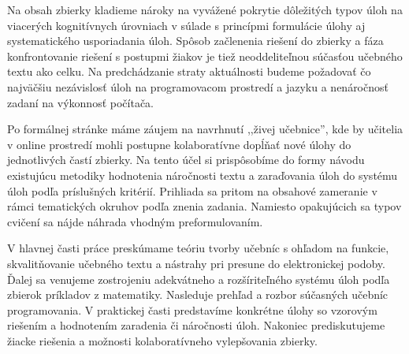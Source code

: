 Na obsah zbierky kladieme nároky na vyvážené pokrytie dôležitých typov úloh na viacerých kognitívnych úrovniach v súlade s princípmi formulácie úlohy aj systematického usporiadania úloh. Spôsob začlenenia riešení do zbierky a fáza konfrontovanie riešení s postupmi žiakov je tiež neoddeliteľnou súčasťou učebného textu ako celku. Na predchádzanie straty aktuálnosti budeme požadovať čo najväčšiu nezávislosť úloh na programovacom prostredí a jazyku a nenáročnosť zadaní na výkonnosť počítača. 

Po formálnej stránke máme záujem na navrhnutí ,,živej učebnice'', kde by učitelia v online prostredí mohli postupne kolaboratívne dopĺňať nové úlohy do jednotlivých častí zbierky. Na tento účel si prispôsobíme do formy návodu existujúcu metodiky hodnotenia náročnosti textu a zaraďovania úloh do systému úloh podľa príslušných kritérií. Prihliada sa pritom na obsahové zameranie v rámci tematických okruhov podľa znenia zadania. Namiesto opakujúcich sa typov cvičení sa nájde náhrada vhodným preformulovaním.

V hlavnej časti práce preskúmame teóriu tvorby učebníc s ohľadom na funkcie, skvalitňovanie učebného textu a nástrahy pri presune do elektronickej podoby. Ďalej sa venujeme zostrojeniu adekvátneho a rozšíriteľného systému úloh podľa zbierok príkladov z matematiky. Nasleduje   prehľad a rozbor súčasných učebníc programovania. V praktickej časti predstavíme konkrétne úlohy so vzorovým riešením a hodnotením zaradenia či náročnosti úloh. Nakoniec prediskutujeme žiacke riešenia a možnosti kolaboratívneho vylepšovania zbierky.